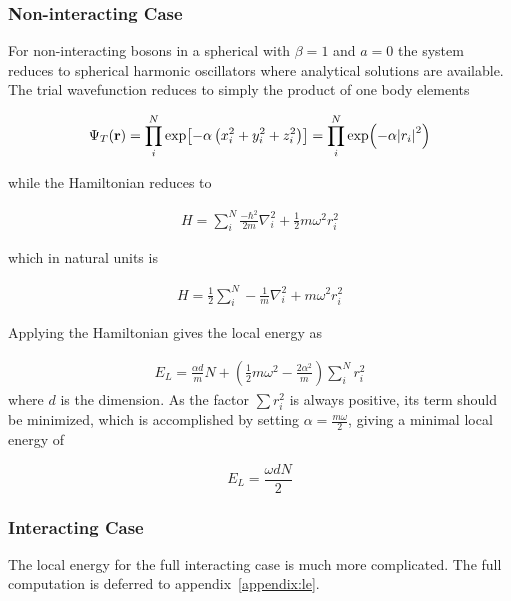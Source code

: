 \subsubsection{Non-interacting Case}
For non-interacting bosons in a spherical with \(\beta = 1\) and \(a = 0\) the
system reduces to spherical harmonic oscillators where analytical solutions are
available. The trial wavefunction reduces to simply the product of one body
elements

\newcommand{\psit}{\Psi_T(\vb{r})}
\newcommand{\onebody}{\prod_{i}^{N}\exp{-\alpha\left[\left( x_i^2 + y_i^2 + \beta
      z_i^2\right)\right]}}
\begin{align*}
  \psit = \prod_{i}^{N}\exp[-\alpha\left( x_{i}^{2}+y_{i}^{2}+z_{i}^{2} \right)] = \prod_{i}^{N}\exp(-\alpha \abs{r_{i}}^{2})
\end{align*}

while the Hamiltonian reduces to

\begin{align*}
  H = \sum_{i}^{N} \frac{-\hbar^{2}}{2m}\nabla_{i}^{2} + \frac{1}{2}m\omega^{2}r_{i}^{2}
\end{align*}

which in natural units is

\newcommand{\lapl}[1]{\nabla_{#1}^2}
\begin{align*}
  H = \frac{1}{2}\sum_{i}^{N} -\frac{1}{m}\lapl{i} + m\omega^{2}r_{i}^{2}
\end{align*}

Applying the Hamiltonian gives the local energy as

\begin{align*}
  E_{L} = \frac{\alpha d}{m} N + \left( \frac{1}{2}m\omega^{2} - \frac{2\alpha^{2}}{m} \right)\sum_{i}^{N}r_{i}^{2}
\end{align*}
 where \(d\) is the dimension. As the factor \(\sum r_{i}^{2}\) is always
 positive, its term should be minimized, which is accomplished by setting
 \(\alpha = \frac{m\omega}{2}\), giving a minimal local energy of

 \begin{equation}
   E_{L} = \frac{\omega d N}{2}
   \label{eq:noninteracting}
 \end{equation}

\subsubsection{Interacting Case}
The local energy for the full interacting case is much more complicated. The
full computation is deferred to appendix~\ref{appendix:le}.





